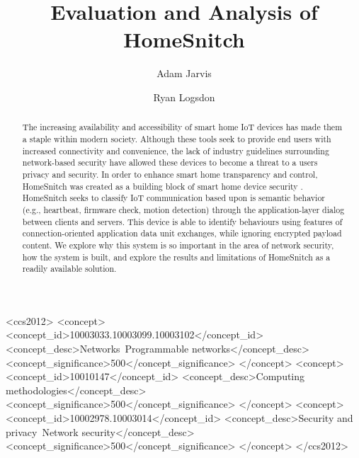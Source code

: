 \documentclass[sigconf]{acmart}
\begin{document}
\title{Evaluation and Analysis of HomeSnitch}


\author{Adam Jarvis}

\author{Ryan Logsdon}





\begin{abstract}
 The increasing availability and accessibility of smart home IoT devices has made them a staple within modern society. Although these tools seek to provide end users with increased connectivity and convenience, the lack of industry guidelines surrounding network-based security have allowed these devices to become a threat to a users privacy and security. In order to enhance smart home transparency and control, HomeSnitch was created as a building block of smart home device security \cite{Enck}. HomeSnitch seeks to classify IoT communication based upon is semantic behavior (e.g., heartbeat, firmware check, motion detection) through the application-layer dialog between clients and servers. This device is able to identify behaviours using features of connection-oriented application data unit exchanges, while ignoring encrypted payload content. We explore why this system is so important in the area of network security, how the system is built, and explore the results and limitations of HomeSnitch as a readily available solution. 
\end{abstract}

%
%
\begin{CCSXML}
<ccs2012>
   <concept>
       <concept_id>10003033.10003099.10003102</concept_id>
       <concept_desc>Networks~Programmable networks</concept_desc>
       <concept_significance>500</concept_significance>
       </concept>
   <concept>
       <concept_id>10010147</concept_id>
       <concept_desc>Computing methodologies</concept_desc>
       <concept_significance>500</concept_significance>
       </concept>
   <concept>
       <concept_id>10002978.10003014</concept_id>
       <concept_desc>Security and privacy~Network security</concept_desc>
       <concept_significance>500</concept_significance>
       </concept>
 </ccs2012>
\end{CCSXML}
\end{document}
